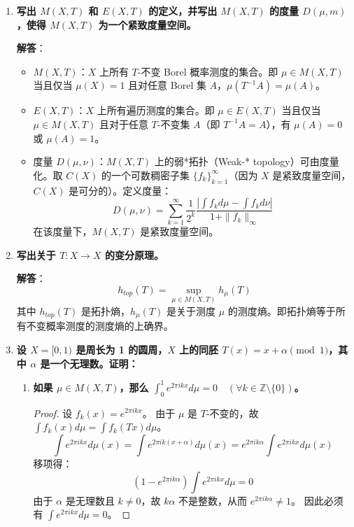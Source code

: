 \documentclass[a4paper,12pt]{article}
\begin{document}
\begin{enumerate}
    \item \textbf{写出 $M(X, T)$ 和 $E(X, T)$ 的定义，并写出 $M(X, T)$ 的度量 $D(\mu, m)$，使得 $M(X, T)$ 为一个紧致度量空间。}
    
    \textbf{解答}：
    \begin{itemize}
        \item $M(X, T)$：$X$ 上所有 $T$-不变 Borel 概率测度的集合。即 $\mu \in M(X, T)$ 当且仅当 $\mu(X)=1$ 且对任意 Borel 集 $A$，$\mu(T^{-1}A) = \mu(A)$。
        \item $E(X, T)$：$X$ 上所有遍历测度的集合。即 $\mu \in E(X, T)$ 当且仅当 $\mu \in M(X, T)$ 且对于任意 $T$-不变集 $A$（即 $T^{-1}A = A$），有 $\mu(A) = 0$ 或 $\mu(A) = 1$。
        \item 度量 $D(\mu, \nu)$：$M(X, T)$ 上的弱*拓扑（Weak-* topology）可由度量化。取 $C(X)$ 的一个可数稠密子集 $\{f_k\}_{k=1}^\infty$（因为 $X$ 是紧致度量空间，$C(X)$ 是可分的）。定义度量：
        $$ D(\mu, \nu) = \sum_{k=1}^\infty \frac{1}{2^k} \frac{\left| \int f_k d\mu - \int f_k d\nu \right|}{1 + \|f_k\|_\infty} $$
        在该度量下，$M(X, T)$ 是紧致度量空间。
    \end{itemize}

    \item \textbf{写出关于 $T: X \to X$ 的变分原理。}
    
    \textbf{解答}：
    $$ h_{top}(T) = \sup_{\mu \in M(X, T)} h_\mu(T) $$
    其中 $h_{top}(T)$ 是拓扑熵，$h_\mu(T)$ 是关于测度 $\mu$ 的测度熵。即拓扑熵等于所有不变概率测度的测度熵的上确界。

    \item \textbf{设 $X = [0, 1)$ 是周长为 1 的圆周，$X$ 上的同胚 $T(x) = x + \alpha \pmod 1$，其中 $\alpha$ 是一个无理数。证明：}
    
    \begin{enumerate}
        \item \textbf{如果 $\mu \in M(X, T)$，那么 $\int_0^1 e^{2\pi i k x} d\mu = 0 \quad (\forall k \in \mathbb{Z} \setminus \{0\})$。}
        
        \begin{proof}
            设 $f_k(x) = e^{2\pi i k x}$。
            由于 $\mu$ 是 $T$-不变的，故 $\int f_k(x) d\mu = \int f_k(T x) d\mu$。
            $$ \int e^{2\pi i k x} d\mu(x) = \int e^{2\pi i k (x+\alpha)} d\mu(x) = e^{2\pi i k \alpha} \int e^{2\pi i k x} d\mu(x) $$
            移项得：
            $$ (1 - e^{2\pi i k \alpha}) \int e^{2\pi i k x} d\mu = 0 $$
            由于 $\alpha$ 是无理数且 $k \neq 0$，故 $k\alpha$ 不是整数，从而 $e^{2\pi i k \alpha} \neq 1$。
            因此必须有 $\int e^{2\pi i k x} d\mu = 0$。
        \end{proof}


\end{enumerate}
\end{enumerate}
\end{document}
